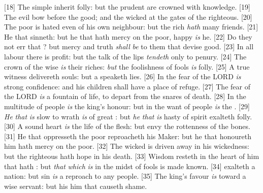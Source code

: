 [18] \textcolor[cmyk]{0.99998,1,0,0}{The simple inherit folly: but the prudent are crowned with knowledge.}
[19] \textcolor[cmyk]{0.99998,1,0,0}{The evil bow before the good; and the wicked at the gates of the righteous.}
[20] \textcolor[cmyk]{0.99998,1,0,0}{The poor is hated even of his own neighbour: but the rich \emph{hath} many friends.}
[21] \textcolor[cmyk]{0.99998,1,0,0}{He that  sinneth: but he that hath mercy on the poor, happy \emph{is} he.}
[22] \textcolor[cmyk]{0.99998,1,0,0}{Do they not err that ? but mercy and truth \emph{shall} \emph{be} to them that devise good.}
[23] \textcolor[cmyk]{0.99998,1,0,0}{In all labour there is profit: but the talk of the lips \emph{tendeth} only to penury.}
[24] \textcolor[cmyk]{0.99998,1,0,0}{The crown of the wise \emph{is} their riches: \emph{but} the foolishness of fools \emph{is} folly.}
[25] \textcolor[cmyk]{0.99998,1,0,0}{A true witness delivereth souls: but a  speaketh lies.}
[26] \textcolor[cmyk]{0.99998,1,0,0}{In the fear of the LORD \emph{is} strong confidence: and his children shall have a place of refuge.}
[27] \textcolor[cmyk]{0.99998,1,0,0}{The fear of the LORD \emph{is} a fountain of life, to depart from the snares of death.}
[28] \textcolor[cmyk]{0.99998,1,0,0}{In the multitude of people \emph{is} the king's honour: but in the want of people \emph{is} the .}
[29] \textcolor[cmyk]{0.99998,1,0,0}{\emph{He} \emph{that} \emph{is} slow to wrath \emph{is} of great : but \emph{he} \emph{that} \emph{is} hasty of spirit exalteth folly.}
[30] \textcolor[cmyk]{0.99998,1,0,0}{A sound heart \emph{is} the life of the flesh: but envy the rottenness of the bones.}
[31] \textcolor[cmyk]{0.99998,1,0,0}{He that oppresseth the poor reproacheth his Maker: but he that honoureth him hath mercy on the poor.}
[32] \textcolor[cmyk]{0.99998,1,0,0}{The wicked is driven away in his wickedness: but the righteous hath hope in his death.}
[33] \textcolor[cmyk]{0.99998,1,0,0}{Wisdom resteth in the heart of him that hath : but \emph{that} \emph{which} \emph{is} in the midst of fools is made known.}
[34] \textcolor[cmyk]{0.99998,1,0,0}{ exalteth a nation: but sin \emph{is} a reproach to any people.}
[35] \textcolor[cmyk]{0.99998,1,0,0}{The king's favour \emph{is} toward a wise servant: but his  him that causeth shame.}


